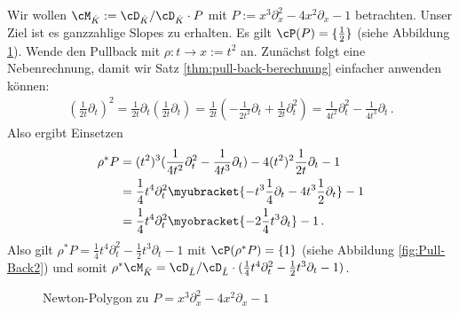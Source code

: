 \begin{exmp}\label{exmp:Pull-Back}
Wir wollen $\cM_{\hat K}:=\cD_{\hat K}/\cD_{\hat K}\cdot P$ mit $P:=
x^3\partial_x^2-4x^2\partial_x-1$ betrachten.
Unser Ziel ist es ganzzahlige Slopes zu erhalten.
Es gilt $\cP(P)=\{\frac{1}{2}\}$ (siehe Abbildung \ref{fig:Pull-Back1}).
Wende den Pullback mit $\rho:t\rightarrow x:=t^2$ an.
Zunächst folgt eine Nebenrechnung, damit wir Satz
\ref{thm:pull-back-berechnung} einfacher anwenden können:
\begin{align*}
(\frac{1}{2t}\partial_t)^2
  = \frac{1}{2t}\partial_t (\frac{1}{2t}\partial_t)
  = \frac{1}{2t}(-\frac{1}{2t^2}\partial_t + \frac{1}{2t}\partial_t^2)
  = \frac{1}{4t^2}\partial_t^2-\frac{1}{4t^3}\partial_t \,.
\end{align*}
Also ergibt Einsetzen
\begin{align*}
\rho^*P &= (t^2)^3(\frac{1}{4t^2}\partial_t^2-\frac{1}{4t^3}\partial_t)-
    4(t^2)^2\frac{1}{2t}\partial_t-1
\\&= \frac{1}{4}t^4\partial_t^2 \myubracket{-t^3\frac{1}{4}\partial_t-
    4t^{3}\frac{1}{2}\partial_t}-1
\\&= \frac{1}{4}t^4\partial_t^2 \myobracket{-2\frac{1}{4}t^3\partial_t}-1 \,.
\end{align*}
%
Also gilt $\rho^*P= \frac{1}{4}t^4\partial_t^2 -\frac{1}{2}t^3\partial_t-1$ mit
$ \cP(\rho^*P)=\{1\} $ (siehe Abbildung \ref{fig:Pull-Back2}) und somit
$\rho^*\cM_{\hat K}=\cD_{\hat L}/\cD_{\hat L}
\cdot(\frac{1}{4}t^4\partial_t^2-\frac{1}{2}t^3\partial_t-1)$.
\begin{figure}[htbp]
  \begin{minipage}[hbt]{0,49\textwidth}
  \begin{center}
  \end{center}
  \caption[Newton-Polygon zu $P=x^3\partial_x^2-4x^2\partial_x-1$]
    {Newton-Polygon zu \newline $P=x^3\partial_x^2-4x^2\partial_x-1$}
  \label{fig:Pull-Back1}
  \end{minipage}
  \begin{minipage}[hbt]{0,49\textwidth}
  \begin{center}
    \begin{tikzpicture}[scale=1.5,descr/.style={fill=white,inner sep=2.5pt}]

\end{tikzpicture}
\end{center}
\end{minipage}
\end{figure}
\end{exmp}
